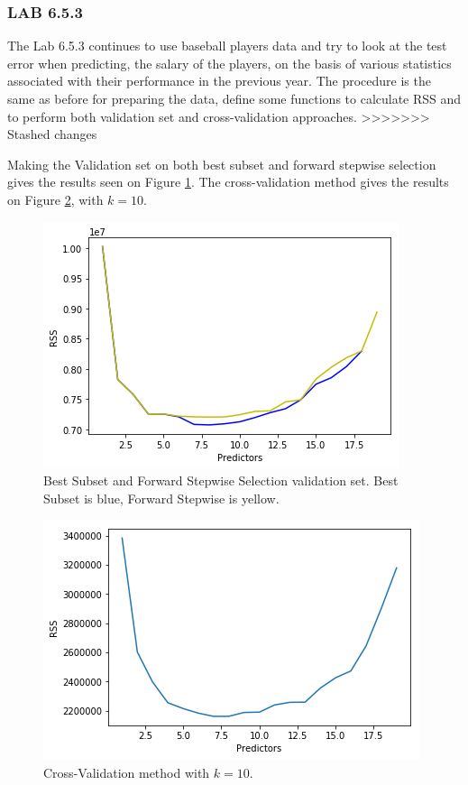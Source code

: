 \subsubsection*{LAB 6.5.3}%
The Lab 6.5.3 continues to use baseball players data and try to look at the test error when predicting, the salary of the players, on the basis of various statistics associated with their performance in the previous year. The procedure is the same as before for preparing the data, define some functions to calculate RSS and to perform both validation set and cross-validation approaches.
>>>>>>> Stashed changes

Making the Validation set on both best subset and forward stepwise selection gives the results seen on Figure \ref{fig:validatedBestSubsetAndForwardStepwise}. The cross-validation method gives the results on Figure \ref{fig:crossValidationRSS}, with $k=10$.

\begin{figure}[h]
	\centering
	\includegraphics[scale=0.4]{subsetSelection/modelQualification/fig/validatedBestSubsetAndForwardStepwise.png}
	\caption{Best Subset and Forward Stepwise Selection validation set. Best Subset is blue, Forward Stepwise is yellow.}
	\label{fig:validatedBestSubsetAndForwardStepwise}
\end{figure}

\begin{figure}[h]
	\centering
	\includegraphics[scale=0.4]{subsetSelection/modelQualification/fig/crossValidation.png}
	\caption{Cross-Validation method with $k=10$.}
	\label{fig:crossValidationRSS}
\end{figure}
